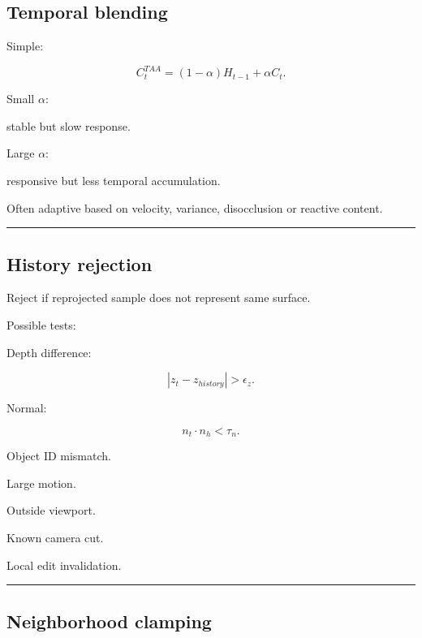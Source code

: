 \subsection{Temporal blending}\label{04-visual-computing-ii-ch040-temporal-blending}

\hypertarget{04-visual-computing-ii-ch040-temporal-blending}{}

Simple:

\[
\boxed{
C_t^{TAA}
=
(1-\alpha)
H_{t-1}
+
\alpha
C_t.
}
\]

Small \(\alpha\):

stable but slow response.

Large \(\alpha\):

responsive but less temporal accumulation.

Often adaptive based on velocity, variance, disocclusion or reactive content.

\begin{center}\rule{0.5\linewidth}{0.5pt}\end{center}

\subsection{History rejection}\label{04-visual-computing-ii-ch040-history-rejection}

\hypertarget{04-visual-computing-ii-ch040-history-rejection}{}

Reject if reprojected sample does not represent same surface.

Possible tests:

Depth difference:

\[
|z_t-z_{history}|>\epsilon_z.
\]

Normal:

\[
n_t\cdot n_h<\tau_n.
\]

Object ID mismatch.

Large motion.

Outside viewport.

Known camera cut.

Local edit invalidation.

\begin{center}\rule{0.5\linewidth}{0.5pt}\end{center}

\subsection{Neighborhood clamping}\label{04-visual-computing-ii-ch040-neighborhood-clamping}

